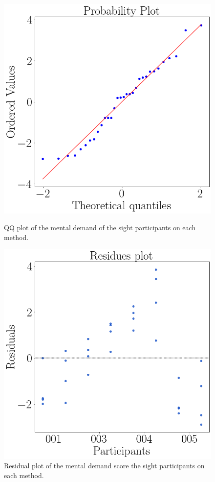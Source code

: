 \begin{figure}[!htb]
    \centering
    \begin{minipage}{0.45\textwidth}
        \centering
        \includegraphics[width = 0.8\linewidth]{Resultados/Sagat/Figuras/png/qqplot_sagat_avg_two_way_sight.png}
        \caption{QQ plot of the mental demand of the sight participants on each method.}
        \label{fig:qqplot_sagat_avg_two_way_sight}
    \end{minipage}
    \begin{minipage}{0.45\textwidth}
        \centering
        \includegraphics[width = 0.8\linewidth]{Resultados/Sagat/Figuras/png/residplot_sagat_avg_two_way_sight.png}
        \caption{Residual plot of the mental demand score the sight participants on each method.}
        \label{fig:residplot_sagat_avg_two_way_sight}
    \end{minipage}
\end{figure}

